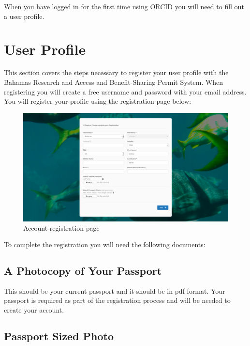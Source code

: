 \documentclass[
]{book}
\begin{document}
When you have logged in for the first time using ORCID you will need to fill out a user profile.

\hypertarget{user-profile}{%
\section{User Profile}\label{user-profile}}

This section covers the steps necessary to register your user profile with the Bahamas Research and Access and Benefit-Sharing Permit System. When registering you will create a free username and password with your email address. You will register your profile using the registration page below:

\begin{figure}
\centering
\includegraphics{images/account_registration.png}
\caption{Account registration page}
\end{figure}

To complete the registration you will need the following documents:

\hypertarget{a-photocopy-of-your-passport}{%
\subsection{A Photocopy of Your Passport}\label{a-photocopy-of-your-passport}}

This should be your current passport and it should be in pdf format. Your passport is required as part of the registration process and will be needed to create your account.

\hypertarget{passport-sized-photo}{%
\subsection{Passport Sized Photo}\label{passport-sized-photo}}
\end{document}
